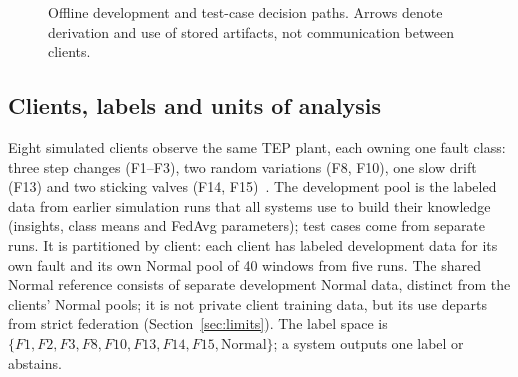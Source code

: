 \documentclass[conference]{IEEEtran}
\newcommand{\TEP}{TEP}
\newcommand{\cond}[1]{\textsf{#1}}
\begin{document}
\begin{figure}[t]
\caption{Offline development and test-case decision paths. Arrows denote derivation and use of stored artifacts, not communication between clients.}
\label{fig:method-flow}
\end{figure}

\subsection{Clients, labels and units of analysis}
Eight simulated clients observe the same \TEP{} plant, each owning one fault class: three step changes (F1--F3), two random variations (F8, F10), one slow drift (F13) and two sticking valves (F14, F15)~\cite{downs1993tep}. The development pool is the labeled data from earlier simulation runs that all systems use to build their knowledge (insights, class means and FedAvg parameters); test cases come from separate runs. It is partitioned by client: each client has labeled development data for its own fault and its own Normal pool of 40 windows from five runs. The shared Normal reference consists of separate development Normal data, distinct from the clients' Normal pools; it is not private client training data, but its use departs from strict federation (Section~\ref{sec:limits}). The label space is $\{F1,F2,F3,F8,F10,F13,F14,F15,\text{Normal}\}$; a system outputs one label or abstains.
\end{document}
